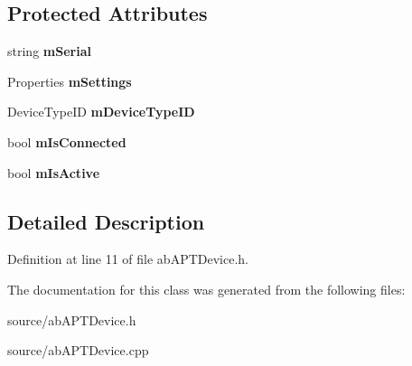 \subsection*{Protected Attributes}
\begin{DoxyCompactItemize}
\item 
string {\bfseries m\+Serial}\hypertarget{class_a_p_t_device_a84777e2ac99df354edcbbccf881df188}{}\label{class_a_p_t_device_a84777e2ac99df354edcbbccf881df188}

\item 
Properties {\bfseries m\+Settings}\hypertarget{class_a_p_t_device_ae2712ffda64d717fe01e4433f119024c}{}\label{class_a_p_t_device_ae2712ffda64d717fe01e4433f119024c}

\item 
Device\+Type\+ID {\bfseries m\+Device\+Type\+ID}\hypertarget{class_a_p_t_device_ae326c547996edf6c317fedf922eafd32}{}\label{class_a_p_t_device_ae326c547996edf6c317fedf922eafd32}

\item 
bool {\bfseries m\+Is\+Connected}\hypertarget{class_a_p_t_device_adf44aaf78a088e71a5eadd3854be193f}{}\label{class_a_p_t_device_adf44aaf78a088e71a5eadd3854be193f}

\item 
bool {\bfseries m\+Is\+Active}\hypertarget{class_a_p_t_device_a5cbf066ccd0c6ec7207f4e288b7ac80d}{}\label{class_a_p_t_device_a5cbf066ccd0c6ec7207f4e288b7ac80d}

\end{DoxyCompactItemize}


\subsection{Detailed Description}


Definition at line 11 of file ab\+A\+P\+T\+Device.\+h.



The documentation for this class was generated from the following files\+:\begin{DoxyCompactItemize}
\item 
source/ab\+A\+P\+T\+Device.\+h\item 
source/ab\+A\+P\+T\+Device.\+cpp\end{DoxyCompactItemize}
